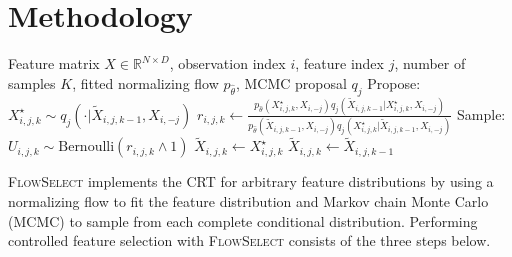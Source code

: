 \documentclass{article}
\newcommand{\FlowSelect}{\textsc{FlowSelect}\xspace}
\begin{document}
\section{Methodology}\label{sec:method}
\begin{algorithm}[b]
\caption{Step 2 of the \FlowSelect procedure for drawing $K$ null features $\tilde X_{i, j} | X_{i, -j}$ for feature $j$ at observation $i$.
}\label{alg:mcmc}
\begin{algorithmic}
   {
    Feature matrix $X \in \mathbb R^{N \times D}$, observation index $i$, feature index $j$, number of samples $K$, fitted normalizing flow $p_{\hat \theta}$, MCMC proposal $q_j$
  }
    \STATE Propose: $X_{i, j, k}^\star \sim q_j(\cdot | \tilde X_{i, j, k-1}, X_{i, -j})$
    \STATE $r_{i, j, k} \leftarrow \frac{p_{\hat \theta}(X_{i, j, k}^\star, X_{i, -j}) q_j(\tilde X_{i, j, k-1} | X_{i, j, k}^\star, X_{i, -j})}{p_{\hat \theta}(\tilde X_{i, j, k-1}, X_{i, -j}) q_j(X_{i, j, k}^\star| \tilde X_{i, j, k-1}, X_{i, -j})}$
    \STATE Sample: $U_{i, j, k} \sim \text{Bernoulli} (r_{i, j, k} \wedge 1)$
    \STATE $\tilde X_{i,j,k} \leftarrow X_{i,j,k}^\star$
    \ELSE
    \STATE $\tilde X_{i,j,k} \leftarrow \tilde X_{i,j,k-1}$
    \ENDIF
  \ENDFOR
\end{algorithmic}
\end{algorithm}

\FlowSelect implements the CRT for arbitrary feature distributions by using a normalizing flow to fit the feature distribution and Markov chain Monte Carlo (MCMC) to sample from each complete conditional distribution.
Performing controlled feature selection with \FlowSelect consists of the three steps below.
\end{document}
